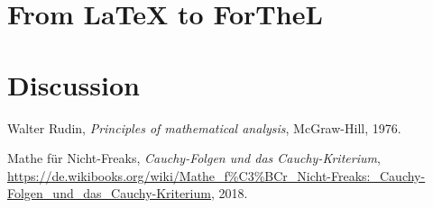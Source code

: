 \documentclass{article}
\begin{document}
\section{{From \LaTeX} to ForTheL}



\section{Discussion}


\begin{thebibliography}{1}

  Walter Rudin,
  \textit{Principles of mathematical analysis},
  McGraw-Hill,
  1976.
  
	Mathe f\"ur Nicht-Freaks,
	\textit{Cauchy-Folgen und das Cauchy-Kriterium},
	\url{https://de.wikibooks.org/wiki/Mathe_f%C3%BCr_Nicht-Freaks:_Cauchy-Folgen_und_das_Cauchy-Kriterium},
	2018.

\end{thebibliography}
  
\end{document}

